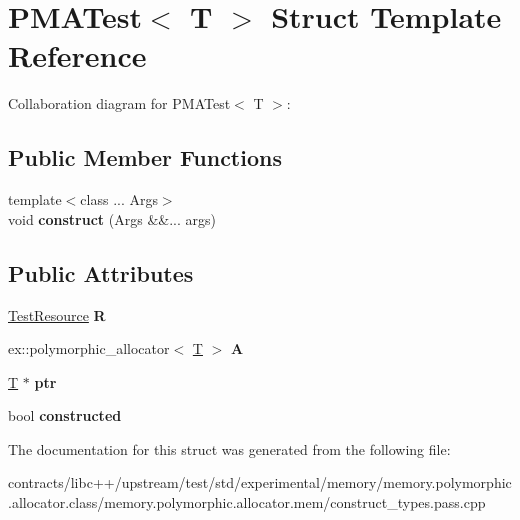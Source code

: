 \hypertarget{struct_p_m_a_test}{}\section{P\+M\+A\+Test$<$ T $>$ Struct Template Reference}
\label{struct_p_m_a_test}


Collaboration diagram for P\+M\+A\+Test$<$ T $>$\+:
\subsection*{Public Member Functions}
\begin{DoxyCompactItemize}
\item 
\mbox{\label{struct_p_m_a_test_a3b48eb0db5df1a4eb3f28e5f12120d79}} 
{\footnotesize template$<$class ... Args$>$ }\\void {\bfseries construct} (Args \&\&... args)
\end{DoxyCompactItemize}
\subsection*{Public Attributes}
\begin{DoxyCompactItemize}
\item 
\mbox{\label{struct_p_m_a_test_a357b364ebd40209305cd990a350a173e}} 
\mbox{\hyperlink{class_test_resource_imp}{Test\+Resource}} {\bfseries R}
\item 
\mbox{\label{struct_p_m_a_test_acf8f57f3708db315975968a4b2b0e9d6}} 
ex\+::polymorphic\+\_\+allocator$<$ \mbox{\hyperlink{struct_t}{T}} $>$ {\bfseries A}
\item 
\mbox{\label{struct_p_m_a_test_a51e71f3cefb0d1c16540ce03b123b661}} 
\mbox{\hyperlink{struct_t}{T}} $\ast$ {\bfseries ptr}
\item 
\mbox{\label{struct_p_m_a_test_adf8468f599c596ad5525454a86fef097}} 
bool {\bfseries constructed}
\end{DoxyCompactItemize}


The documentation for this struct was generated from the following file\+:\begin{DoxyCompactItemize}
\item 
contracts/libc++/upstream/test/std/experimental/memory/memory.\+polymorphic.\+allocator.\+class/memory.\+polymorphic.\+allocator.\+mem/construct\+\_\+types.\+pass.\+cpp\end{DoxyCompactItemize}
